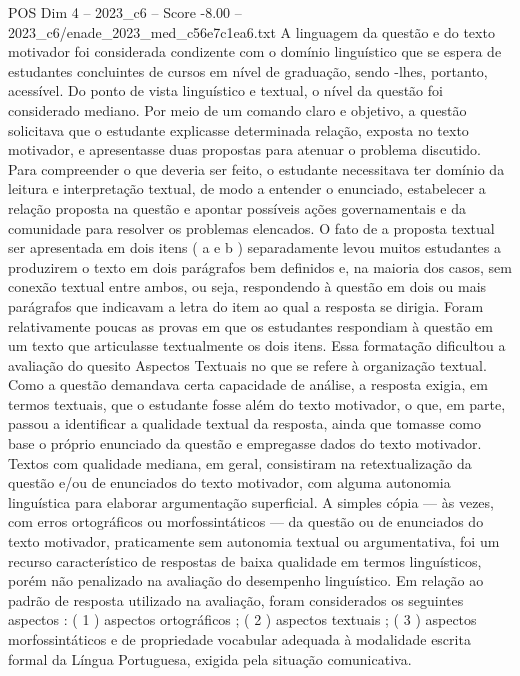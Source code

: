 \begin{textsample}{POS Dim 4 – 2023\_c6 – Score -8.00 – 2023\_c6/enade\_2023\_med\_c56e7c1ea6.txt}
A linguagem da questão e do texto motivador foi considerada condizente com o domínio linguístico que se espera de estudantes concluintes de cursos em nível de graduação, sendo -lhes, portanto, acessível.
Do ponto de vista linguístico e textual, o nível da questão foi considerado mediano.
Por meio de um comando claro e objetivo, a questão solicitava que o estudante explicasse determinada relação, exposta no texto motivador, e apresentasse duas propostas para atenuar o problema discutido.
Para compreender o que deveria ser feito, o estudante necessitava ter domínio da leitura e interpretação textual, de modo a entender o enunciado, estabelecer a relação proposta na questão e apontar possíveis ações governamentais e da comunidade para resolver os problemas elencados.
O fato de a proposta textual ser apresentada em dois itens ( a e b ) separadamente levou muitos estudantes a produzirem o texto em dois parágrafos bem definidos e, na maioria dos casos, sem conexão textual entre ambos, ou seja, respondendo à questão em dois ou mais parágrafos que indicavam a letra do item ao qual a resposta se dirigia.
Foram relativamente poucas as provas em que os estudantes respondiam à questão em um texto que articulasse textualmente os dois itens.
Essa formatação dificultou a avaliação do quesito Aspectos Textuais no que se refere à organização textual.
Como a questão demandava certa capacidade de análise, a resposta exigia, em termos textuais, que o estudante fosse além do texto motivador, o que, em parte, passou a identificar a qualidade textual da resposta, ainda que tomasse como base o próprio enunciado da questão e empregasse dados do texto motivador.
Textos com qualidade mediana, em geral, consistiram na retextualização da questão e/ou de enunciados do texto motivador, com alguma autonomia linguística para elaborar argumentação superficial.
A simples cópia — às vezes, com erros ortográficos ou morfossintáticos — da questão ou de enunciados do texto motivador, praticamente sem autonomia textual ou argumentativa, foi um recurso característico de respostas de baixa qualidade em termos linguísticos, porém não penalizado na avaliação do desempenho linguístico.
Em relação ao padrão de resposta utilizado na avaliação, foram considerados os seguintes aspectos : ( 1 ) aspectos ortográficos ; ( 2 ) aspectos textuais ; ( 3 ) aspectos morfossintáticos e de propriedade vocabular adequada à modalidade escrita formal da Língua Portuguesa, exigida pela situação comunicativa.

\end{textsample}
